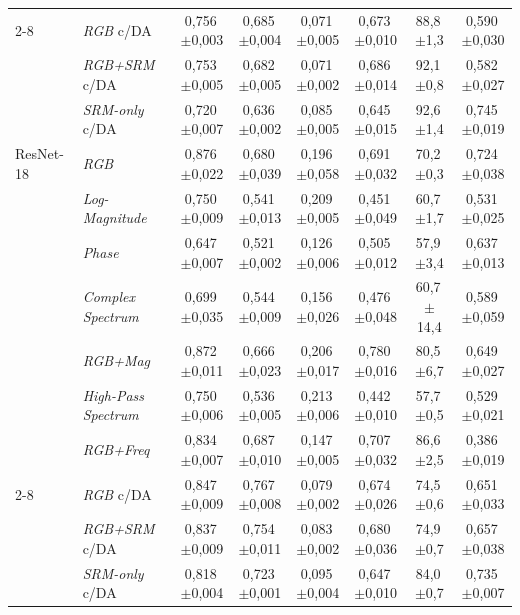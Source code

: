 \documentclass[10pt,conference]{IEEEtran}
\newcommand{\pmsd}[2]{#1\,{\scriptsize$\pm$#2}}
\begin{document}
\begin{table}[!t]
\begin{tabular}{@{}ll ccc ccc@{}}
 \cmidrule(l){2-8}
 & \textit{RGB} c/DA & \pmsd{0,756}{0,003} & \pmsd{0,685}{0,004} & \pmsd{0,071}{0,005} & \pmsd{0,673}{0,010} & \pmsd{88,8}{1,3} & \pmsd{0,590}{0,030} \\
 & \textit{RGB+SRM} c/DA & \pmsd{0,753}{0,005} & \pmsd{0,682}{0,005} & \pmsd{0,071}{0,002} & \pmsd{0,686}{0,014} & \pmsd{92,1}{0,8} & \pmsd{0,582}{0,027} \\
 & \textit{SRM-only} c/DA & \pmsd{0,720}{0,007} & \pmsd{0,636}{0,002} & \pmsd{0,085}{0,005} & \pmsd{0,645}{0,015} & \pmsd{92,6}{1,4} & \pmsd{0,745}{0,019} \\
\midrule
ResNet-18~\cite{ref_resnet} & \textit{RGB} & \pmsd{0,876}{0,022} & \pmsd{0,680}{0,039} & \pmsd{0,196}{0,058} & \pmsd{0,691}{0,032} & \pmsd{70,2}{0,3} & \pmsd{0,724}{0,038} \\
 & \textit{Log-Magnitude} & \pmsd{0,750}{0,009} & \pmsd{0,541}{0,013} & \pmsd{0,209}{0,005} & \pmsd{0,451}{0,049} & \pmsd{60,7}{1,7} & \pmsd{0,531}{0,025} \\
 & \textit{Phase} & \pmsd{0,647}{0,007} & \pmsd{0,521}{0,002} & \pmsd{0,126}{0,006} & \pmsd{0,505}{0,012} & \pmsd{57,9}{3,4} & \pmsd{0,637}{0,013} \\
 & \textit{Complex Spectrum} & \pmsd{0,699}{0,035} & \pmsd{0,544}{0,009} & \pmsd{0,156}{0,026} & \pmsd{0,476}{0,048} & \pmsd{60,7}{14,4} & \pmsd{0,589}{0,059} \\
 & \textit{RGB+Mag} & \pmsd{0,872}{0,011} & \pmsd{0,666}{0,023} & \pmsd{0,206}{0,017} & \pmsd{0,780}{0,016} & \pmsd{80,5}{6,7} & \pmsd{0,649}{0,027} \\
 & \textit{High-Pass Spectrum} & \pmsd{0,750}{0,006} & \pmsd{0,536}{0,005} & \pmsd{0,213}{0,006} & \pmsd{0,442}{0,010} & \pmsd{57,7}{0,5} & \pmsd{0,529}{0,021} \\
 & \textit{RGB+Freq} & \pmsd{0,834}{0,007} & \pmsd{0,687}{0,010} & \pmsd{0,147}{0,005} & \pmsd{0,707}{0,032} & \pmsd{86,6}{2,5} & \pmsd{0,386}{0,019} \\
 \cmidrule(l){2-8}
 & \textit{RGB} c/DA & \pmsd{0,847}{0,009} & \pmsd{0,767}{0,008} & \pmsd{0,079}{0,002} & \pmsd{0,674}{0,026} & \pmsd{74,5}{0,6} & \pmsd{0,651}{0,033} \\
 & \textit{RGB+SRM} c/DA & \pmsd{0,837}{0,009} & \pmsd{0,754}{0,011} & \pmsd{0,083}{0,002} & \pmsd{0,680}{0,036} & \pmsd{74,9}{0,7} & \pmsd{0,657}{0,038} \\
 & \textit{SRM-only} c/DA & \pmsd{0,818}{0,004} & \pmsd{0,723}{0,001} & \pmsd{0,095}{0,004} & \pmsd{0,647}{0,010} & \pmsd{84,0}{0,7} & \pmsd{0,735}{0,007} \\

\end{tabular}
\end{table}
\end{document}
